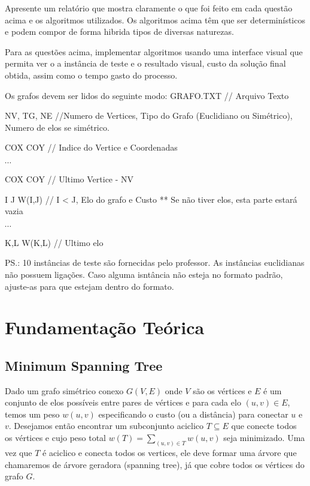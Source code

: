 \documentclass[12pt,a4paper]{article}
\begin{document}
Apresente um relatório que mostra claramente o que foi feito em cada questão
acima e os algoritmos utilizados. Os algoritmos acima têm que ser
determinísticos e podem compor de forma hibrida tipos de diversas naturezas.

Para as questões acima, implementar algoritmos usando uma interface visual que
permita ver o a instância de teste e o resultado visual, custo da solução final
obtida, assim como o tempo gasto do processo.

Os grafos devem ser lidos do seguinte modo: GRAFO.TXT // Arquivo Texto

NV, TG, NE //Numero de Vertices, Tipo do Grafo (Euclidiano ou Simétrico), Numero
de elos se simétrico.

COX COY // Indice do Vertice e Coordenadas

$\cdots$

COX COY // Ultimo Vertice - NV

I J W(I,J) // I < J, Elo do grafo e Custo ** Se não tiver elos, esta parte
estará vazia

$\cdots$

K,L W(K,L) // Ultimo elo

PS.: 10 instâncias de teste são fornecidas pelo professor. As instâncias
euclidianas não possuem ligações. Caso alguma isntância não esteja no formato
padrão, ajuste-as para que estejam dentro do formato.

\section{Fundamentação Teórica}
\subsection{Minimum Spanning Tree} %
Dado um grafo simétrico conexo $G(V,E)$ onde $V$ são os vértices e $E$ é um
conjunto de elos possíveis entre pares de vértices e para cada elo $(u, v) \in
E$, temos um peso $w(u, v)$ especificando o custo (ou a distância) para conectar
$u$ e $v$. Desejamos então encontrar um subconjunto aciclico $T \subseteq E$ que
conecte todos os vértices e cujo peso total $w(T) = \sum_{(u, v) \in T} w(u, v)$
seja minimizado. Uma vez que $T$ é aciclico e conecta todos os vertices, ele
deve formar uma árvore que chamaremos de árvore geradora (spanning tree), já que
cobre todos os vértices do grafo $G$\cite[p. 584]{cormen2001introduction}.
\end{document}
